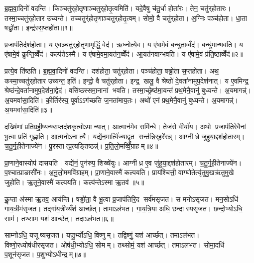
\clearpage
{}
\setcounter{anuvakam}{0}
ब्र॒ह्म॒वा॒दिनो॑ वदन्ति। किञ्चतु॑र्‌होतृणाञ्चतुर्‌होतृ॒त्वमिति॑। यदे॒वैषु च॑तु॒र्धा होता॑रः। तेन॒ चतु॑र्‌होतारः। तस्मा॒च्चतु॑र्‌होतार उच्यन्ते। तच्चतुर्॑होतृणाञ्चतुर्‌होतृ॒त्वम्। सोमो॒ वै चतु॑र्‌होता। अ॒ग्निः पञ्च॑होता। धा॒ता षड्ढो॑ता। इन्द्र॑स्स॒प्तहो॑ता॥१॥

प्र॒जाप॑ति॒र्दश॑होता। य ए॒वञ्चतु॑र्‌होतृणा॒मृद्धिं॒ वेद॑। ऋ॒ध्नोत्ये॒व। य ए॑षामे॒वं ब॒न्धुता॒व्वेँद॑। बन्धु॑मान्भवति। य ए॑षामे॒वं कॢप्ति॒व्वेँद॑। कल्प॑तेऽस्मै। य ए॑षामे॒वमा॒यत॑न॒व्वेँद॑। आ॒यत॑नवान्भवति। य ए॑षामे॒वं प्र॑ति॒ष्ठाव्वेँद॑॥२॥

प्रत्ये॒व ति॑ष्ठति। ब्र॒ह्म॒वा॒दिनो॑ वदन्ति। दश॑होता॒ चतु॑र्‌होता। पञ्च॑होता॒ षड्ढो॑ता स॒प्तहो॑ता। अथ॒ कस्मा॒च्चतु॑र्‌होतार उच्यन्त॒ इति॑। इन्द्रो॒ वै चतु॑र्‌होता। इन्द्र॒ खलु॒ वै श्रेष्ठो॑ दे॒वता॑नामुप॒देश॑नात्। य ए॒वमिन्द्र॒ श्रेष्ठ॑न्दे॒वता॑नामुप॒देश॑ना॒द्वेद॑। वसि॑ष्ठस्समा॒नानां भवति। तस्मा॒च्छ्रेष्ठ॑मा॒यन्तं॑ प्रथ॒मेनै॒वानु॑ बुध्यन्ते। अ॒यमागन्न्॑। अ॒यमवा॑सा॒दिति॑। की॒र्तिर॑स्य॒ पूर्वाऽऽग॑च्छति ज॒नता॑माय॒तः। अथो॑ एनं प्रथ॒मेनै॒वानु॑ बुध्यन्ते। अ॒यमागन्न्॑। अ॒यमवा॑सा॒दिति॑॥३॥\anuvakamend[स॒प्तहो॑ता प्रति॒ष्ठाव्वेँद॑ बुध्यन्ते॒ षट्च॑]

दख्षि॑णां प्रतिग्रही॒ष्यन्थ्स॒प्तद॑श॒कृत्वोऽपान्यात्। आ॒त्मान॑मे॒व समि॑न्धे। तेज॑से वी॒र्या॑य। अथो प्र॒जाप॑तिरे॒वैनां भू॒त्वा प्रति॑ गृह्णाति। आ॒त्मनोऽनार्त्यै। यद्ये॑न॒मार्त्वि॑ज्याद्वृ॒त सन्त॑न्नि॒र्‌हरे॑रन्न्। आग्नीध्रे जुहुया॒द्दश॑होतारम्। च॒तु॒र्गृ॒ही॒तेनाज्ये॑न। पु॒रस्तात्प्र॒त्यङ्तिष्ठन्न्॑। प्र॒ति॒लो॒मव्विँ॒ग्राहम्॥४॥

प्रा॒णाने॒वास्योप॑ दासयति। यद्ये॑नं॒ पुन॑रुप॒ शिख्षे॑युः। आग्नीध्र ए॒व जु॑हुया॒द्दश॑होतारम्। च॒तु॒र्गृ॒ही॒तेनाज्ये॑न। प॒श्चात्प्राङासी॑नः। अ॒नु॒लो॒ममवि॑ग्राहम्। प्रा॒णाने॒वास्मै॑ कल्पयति। प्राय॑श्चित्ती॒ वाग्घोतेत्यृ॑तुमु॒खऋ॑तुमुखे जुहोति। ऋ॒तूने॒वास्मै॑ कल्पयति। कल्प॑न्तेऽस्मा ऋ॒तव॑॥५॥

कॢ॒प्ता अ॑स्मा ऋ॒तव॒ आय॑न्ति। षड्ढो॑ता॒ वै भू॒त्वा प्र॒जाप॑तिरि॒द सर्व॑मसृजत। स मनो॑ऽसृजत। मन॒सोऽधि॑ गाय॒त्रीम॑सृजत। तद्गा॑य॒त्रीय्यँश॑ आर्च्छत्। तामाऽल॑भत। गा॒य॒त्रि॒या अधि॒ छन्दास्यसृजत। छन्दो॒भ्योऽधि॒ साम॑। तथ्साम॒ यश॑ आर्च्छत्। तदाऽल॑भत॥६॥

साम्नोऽधि॒ यजूष्यसृजत। यजु॒र्भ्योऽधि॒ विष्णुम्। तद्विष्णुं॒ यश॑ आर्च्छत्। तमाऽल॑भत। विष्णो॒रध्योष॑धीरसृजत। ओष॑धी॒भ्योऽधि॒ सोमम्। तथ्सोमं॒ यश॑ आर्च्छत्। तमाऽल॑भत। सोमा॒दधि॑ प॒शून॑सृजत। प॒शुभ्योऽधीन्द्रम्॥७॥

